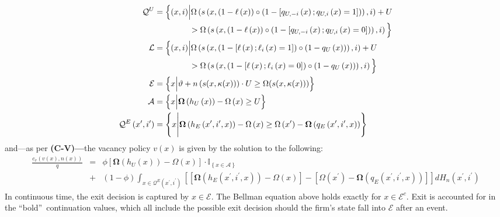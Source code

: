 \begin{align}
\label{eq:SetsArbitraryState}
\mathcal{Q}^{U} &=\Big\{ (x,i)\Big|\Omega \left( s\left( x,\left( 1-\ell
\left( x\right) \right) \circ \left( 1-\left[ q_{U,-i}\left( x\right)
;q_{U,i}\left( x\right) =1\right] \right) \right) ,i\right) +U  \nonumber \\
& \hskip1.5cm >\Omega \left( s\left( x,\left( 1-\ell \left( x\right) \right)
\circ \left( 1-\left[ q_{U,-i}\left( x\right) ;q_{U,i}\left( x\right) =0%
\right] \right) \right) ,i\right) \Big\} \\
\mathcal{L} &=\Big\{ (x,i)\Big|\Omega \left( s\left( x,\left( 1-\left[ \ell
\left( x\right) ;\ell _{i}\left( x\right) =1\right] \right) \circ \left(
1-q_{U}\left( x\right) \right) \right) ,i\right) +U  \nonumber \\
& \hskip1.5cm >\Omega \left( s\left( x,\left( 1-\left[ \ell \left( x\right)
;\ell _{i}\left( x\right) =0\right] \right) \circ \left( 1-q_{U}\left(
x\right) \right) \right) ,i\right) \Big\} \\
\mathcal{E} &=\left\{ x\Big|\vartheta +n\left( s(x,\kappa(x))\right) \cdot
U\geq \Omega (s(x,\kappa(x)))\right\} \\
\mathcal{A}& =\left\{ x\Big|\boldsymbol{\Omega }\left( h_{U}\left( x\right)
\right) -\Omega \left( x\right) \geq U\right\} \\
\mathcal{Q}^{E}\left( x^{\prime },i^{\prime }\right) & =\left\{ x\Bigg|%
\boldsymbol{\Omega }\left( h_{E}\left( x^{\prime },i^{\prime },x\right) \right)
-\Omega \left( x\right) \geq \Omega \left( x^{\prime }\right) -\boldsymbol{%
\Omega }\left( q_{E}\left( x^{\prime },i^{\prime },x\right) \right) \right\}
\end{align}%
and---as per \textbf{(C-V)---}the vacancy policy $v\left( x\right) $ is
given by the solution to the following:
\begin{eqnarray}
\label{eq:VacanciesArbitraryState}
\frac{c_{v}\left( v\left( x\right) ,n\left( x\right) \right) }{q}&=&\phi %
\left[ \boldsymbol{\Omega }\left( h_{U}\left( x\right) \right) -\Omega \left(
x\right) \right] \cdot \mathbb{I}_{\left\{ x\in \mathcal{A}\right\} } \nonumber \\
& +&\left( 1-\phi \right) \int_{x\in \mathcal{Q}^{E}\left( x^{\prime
},i^{\prime }\right) }\left[ \left[ \boldsymbol{\Omega }\left( h_{E}\left(
x^{\prime },i^{\prime },x\right) \right) -\Omega \left( x\right) \right] -%
\left[ \Omega \left( x^{\prime }\right) -\boldsymbol{\Omega }\left( q_{E}\left(
x^{\prime },i^{\prime },x\right) \right) \right] \right]dH_n\left( x^{\prime
},i^{\prime }\right)
\end{eqnarray}%
In continuous time, the exit decision is captured by $x\in \mathcal{E}$. The
Bellman equation above holds exactly for $x\in \mathcal{E}^{c}$. Exit is
accounted for in the \textquotedblleft bold\textquotedblright\ continuation
values, which all include the possible exit decision should the firm's state
fall into $\mathcal{E}$ after an event.


